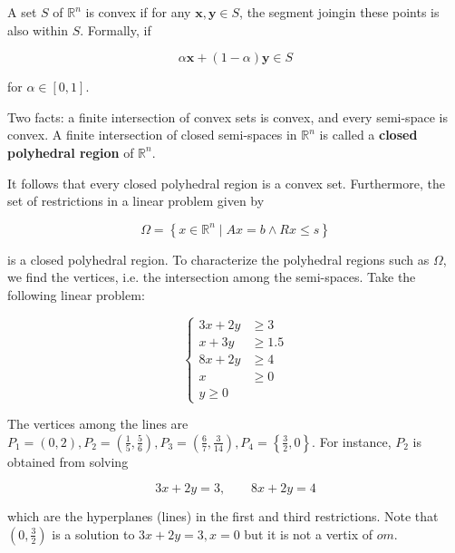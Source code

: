 \documentclass[12pt]{article}
\theoremstyle{definition}
\begin{document}
\begin{definition}
    A set $S$ of $\mathbb{R}^n$ is convex if for any $\textbf{x}, \textbf{y} \in
    S$, the segment joingin these points is also within $S$. Formally, if 

    \begin{equation*}
        \alpha \textbf{x} + (1-\alpha)\textbf{y} \in S
    \end{equation*}

    for $\alpha \in [0, 1]$.
\end{definition}

Two facts: a finite intersection of convex sets is convex, and every semi-space
is convex. A finite intersection of closed semi-spaces in $\mathbb{R}^n$ is
called a \textbf{closed polyhedral region} of $\mathbb{R}^n$.

It follows that every closed polyhedral region is a convex set. Furthermore, the
set of restrictions in a linear problem given by 

\begin{equation*}
    \Omega = \left\{ x \in \mathbb{R}^n \mid Ax = b \land Rx \leq s \right\} 
\end{equation*}

is a closed polyhedral region. To characterize the polyhedral regions such as
$\Omega$, we find the vertices, i.e. the intersection among the semi-spaces.
Take the following linear problem: 

\begin{equation*}
    \begin{cases}
        3x + 2y &\geq 3 \\ 
        x + 3y &\geq 1.5\\ 
        8x + 2y &\geq 4 \\ 
        x & \geq 0 \\ 
        y \geq 0
    \end{cases}
\end{equation*}

The vertices among the lines are $P_1 = (0, 2), P_2 = \left( \frac{1}{5},
\frac{5}{6} \right) , P_3 = \left( \frac{6}{7}, \frac{3}{14} \right), P_4 =
\left\{ \frac{3}{2}, 0 \right\} $. For instance, $P_2$ is obtained from solving 

\begin{equation*}
    3x + 2y = 3, \qquad 8x + 2y = 4
\end{equation*}

which are the hyperplanes (lines) in the first and third restrictions. Note that
$\left( 0, \frac{3}{2} \right) $ is a solution to $3x + 2y = 3, x = 0$ but it is
not a vertix of $om$.

\pagebreak 
\end{document}
